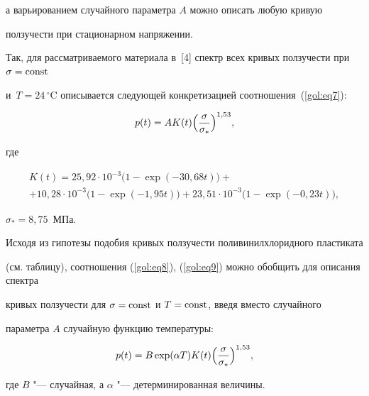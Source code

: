 а варьированием случайного параметра $A$ можно описать любую кривую

ползучести при стационарном напряжении.

Так, для рассматриваемого материала в~[4] спектр всех кривых ползучести при $\sigma = \rm const$

и~$T=24\,^\circ$C описывается следующей конкретизацией соотношения~(\ref{gol:eq7}):

\begin{equation}

\label{gol:eq8}

p(t)=A K(t) \Bigl(\frac{\sigma }{\sigma _\ast } \Bigr)^{1,53},

\end{equation}

где

\begin{multline}

\label{gol:eq9}

K(t)=

25,92\cdot 10^{-3}\bigl( 1-\exp(-30,68t) \bigr)+ \\

+

10,28\cdot 10^{-3}\bigl( 1-\exp (-1,95t) \bigr)+

23,51\cdot 10^{-3}\bigl( 1-\exp (-0,23t) \bigr),

\end{multline}

$\sigma _\ast =8,75$~МПа.



Исходя из гипотезы подобия кривых ползучести поливинилхлоридного пластиката

(см. таблицу), соотношения (\ref{gol:eq8}), (\ref{gol:eq9}) можно обобщить для описания спектра

кривых ползучести для $\sigma = \rm const$ и $T= \rm const$, введя вместо случайного

параметра $A$ случайную функцию температуры:

\begin{equation}

\label{gol:eq10}

p(t)=B \exp(\alpha T) K(t) \Bigl( \frac{\sigma }{\sigma _\ast } \Bigr)^{1,53},

\end{equation}

где $B$ "--- случайная, а $\alpha $ "--- детерминированная величины.



